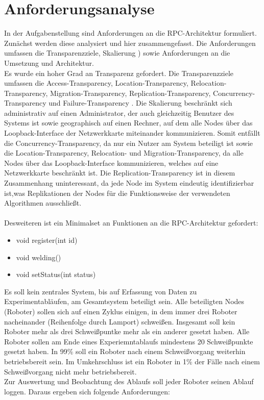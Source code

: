 %
\chapter{Anforderungsanalyse}

In der Aufgabenstellung sind Anforderungen an die RPC-Architektur formuliert.
Zunächst werden diese analysiert und hier zusammengefasst.
Die Anforderungen umfassen die Transparenzziele, Skalierung \cite{tanenbaumvansteen}) sowie Anforderungen
an die Umsetzung und Architektur.\\
Es wurde ein hoher Grad an Transparenz gefordert.
Die Transparenzziele umfassen die Access-Transparency, Location-Transparency, Relocation-Transparency,
Migration-Transparency, Replication-Transparency, Concurrency-Transparency und Failure-Transparency \citep{tanenbaumvansteen}.
Die Skalierung beschränkt sich administrativ auf einen Administrator, der auch gleichzeitig
Benutzer des Systems ist sowie geographisch auf einen Rechner, auf dem alle Nodes 
\citep{tanenbaumvansteen} über das Loopback-Interface der Netzwerkkarte miteinander kommunizieren.
Somit entfällt die Concurrency-Transparency, da nur ein Nutzer am System beteiligt ist sowie die
Location-Transparency, Relocation- und Migration-Transparency, da alle Nodes über das Loopback-Interface
kommunizieren, welches auf eine Netzwerkkarte beschränkt ist. Die Replication-Transparency ist in diesem Zusammenhang 
uninteressant, da jede Node im System eindeutig identifizierbar ist,was Replikationen der Nodes für die Funktionsweise 
der verwendeten Algorithmen ausschließt.\\\\
Desweiteren ist ein Minimalset an Funktionen an die RPC-Architektur gefordert:
\begin{itemize}
  \item void register(int id)
  \item void welding()
  \item void setStatus(int status)
\end{itemize}
\newpage
Es soll kein zentrales System, bis auf Erfassung von Daten zu Experimentabläufen, am Gesamtsystem beteiligt
sein.
Alle beteiligten Nodes (Roboter) sollen sich auf einen Zyklus einigen, in dem immer drei Roboter nacheinander
(Reihenfolge durch Lamport) schweißen.
Insgesamt soll kein Roboter mehr als drei Schweißpuntke mehr als ein anderer gesetzt haben.
Alle Roboter sollen am Ende eines Experiemntablaufs mindestens 20 Schweißpunkte gesetzt haben.
In 99\% soll ein Roboter nach einem Schweißvorgang weiterhin betriebsbereit sein. Im Umkehrschluss
ist ein Roboter in 1\% der Fälle nach einem Schweißvorgang nicht mehr betriebsbereit.\\
Zur Auswertung und Beobachtung des Ablaufs soll jeder Roboter seinen Ablauf loggen.
Daraus ergeben sich folgende Anforderungen:

